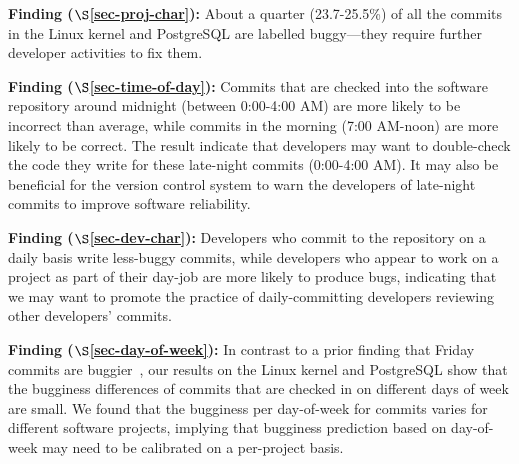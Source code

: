 \begin{list}{}{\topsep=0pt\parsep=0pt\leftmargin=9pt\itemindent=0pt}

\item {\bf Finding \fbuggy ($\S$\ref{sec-proj-char}):} 
About a quarter (23.7-25.5\%) of all the commits in the Linux kernel and
PostgreSQL are labelled buggy---they require further developer activities to fix
them.

\item {\bf Finding \fhour ($\S$\ref{sec-time-of-day}):} 
Commits that are checked into the software repository around midnight (between
0:00-4:00 AM) are more likely to be incorrect than average, while commits in the
morning (7:00 AM-noon) are more likely to be correct. The result indicate that
developers may want to double-check the code they write for these late-night
commits (0:00-4:00 AM). It may also be beneficial for the version control
system to warn the developers of late-night commits to improve software
reliability.

\item {\bf Finding \fdaily ($\S$\ref{sec-dev-char}):} 
Developers who commit to the repository on a daily basis write less-buggy
commits, while developers who appear to work on a project as part of their
day-job are more likely to produce bugs, indicating that we may want to promote
the practice of daily-committing developers reviewing other developers'
commits.

\item {\bf Finding \fday ($\S$\ref{sec-day-of-week}):} 
In contrast to a prior finding that Friday commits are
buggier~\cite{sliwerski-msr-2005}, our results on the Linux kernel and
PostgreSQL show that the bugginess differences of commits that are checked in on
different days of week are small. We found that the bugginess per
day-of-week for commits varies for different software projects, implying that
bugginess prediction based on day-of-week may need to be calibrated on a 
per-project basis.

\end{list}
